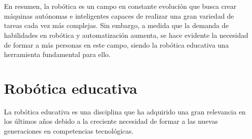 \section*{}
En resumen, la robótica es un campo en constante evolución que busca crear máquinas autónomas e inteligentes capaces de realizar una gran variedad de tareas cada vez 
más complejas. Sin embargo, a medida que la demanda de habilidades en robótica y automatización aumenta, se hace evidente la necesidad de formar a 
más personas en este campo, siendo la robótica educativa una herramienta fundamental para ello. 


\section{Robótica educativa}
\label{sec:rob_educativa}
\noindent La robótica educativa es una disciplina que ha adquirido una gran relevancia en los últimos años debido a la creciente necesidad de formar a las nuevas generaciones en
competencias tecnológicas.
